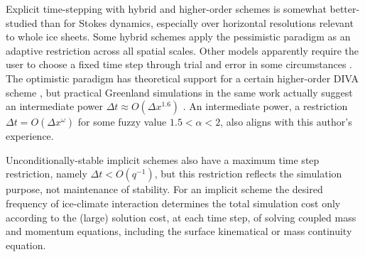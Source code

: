 \documentclass[review,letterpaper]{igs}
\begin{document}
Explicit time-stepping with hybrid and higher-order schemes is somewhat better-studied than for Stokes dynamics, especially over horizontal resolutions relevant to whole ice sheets.  Some hybrid schemes apply the pessimistic paradigm as an adaptive restriction \citep{Winkelmannetal2011} across all spatial scales.  Other models apparently require the user to choose a fixed time step through trial and error in some circumstances \citep[for example]{Fischleretal2022,Robinsonetal2022}.  The optimistic paradigm has theoretical support for a certain higher-order DIVA scheme \citep[Equation (52)]{Robinsonetal2022}, but practical Greenland simulations in the same work actually suggest an intermediate power $\Delta t \approx O(\Delta x^{1.6})$ \citep[Figure 3(a)]{Robinsonetal2022}.  An intermediate power, a restriction $\Delta t = O(\Delta x^\omega)$ for some fuzzy value $1.5<\alpha<2$, also aligns with this author's experience.

Unconditionally-stable implicit schemes also have a maximum time step restriction, namely $\Delta t < O(q^{-1})$, but this restriction reflects the simulation purpose, not maintenance of stability.  For an implicit scheme the desired frequency of ice-climate interaction determines the total simulation cost only according to the (large) solution cost, at each time step, of solving coupled mass and momentum equations, including the surface kinematical or mass continuity equation.

\end{document}
